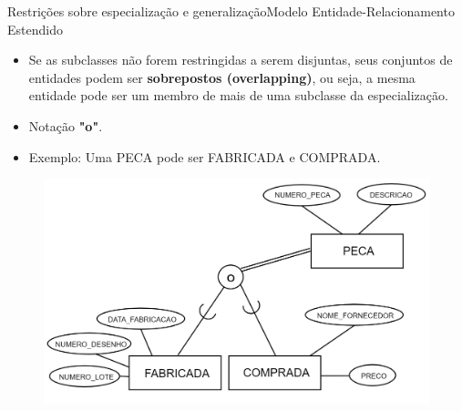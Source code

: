 \documentclass[t]{beamer}
\begin{document}

\begin{ftst}{Restrições sobre especialização e generalização}{Modelo Entidade-Relacionamento Estendido}
\small
\begin{itemize}
    \item Se as subclasses não forem restringidas a serem disjuntas, seus conjuntos de entidades podem ser \textbf{sobrepostos (overlapping)}, ou seja, a mesma entidade pode ser um membro de mais de uma subclasse da especialização.
    \item Notação \textbf{"o"}.
    \item Exemplo: Uma PECA pode ser FABRICADA e COMPRADA.
\end{itemize}
\begin{figure}
    \centering
    \includegraphics[scale=0.13]{Figuras/02_2.png}
\end{figure}

\end{ftst}

\end{document}
